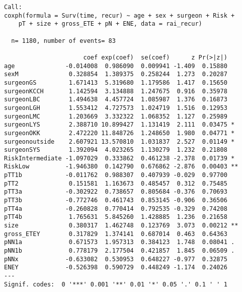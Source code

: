 \documentclass[
  letterpaper,
  DIV=11,
  numbers=noendperiod]{scrartcl}
\begin{document}
\begin{verbatim}
Call:
coxph(formula = Surv(time, recur) ~ age + sex + surgeon + Risk + 
    pT + size + gross_ETE + pN + ENE, data = rai_recur)

  n= 1180, number of events= 83 

                      coef exp(coef)  se(coef)      z Pr(>|z|)   
age              -0.014008  0.986090  0.009941 -1.409  0.15880   
sexM              0.328854  1.389375  0.258244  1.273  0.20287   
surgeonGS         1.671413  5.319680  1.179586  1.417  0.15650   
surgeonKCCH       1.142594  3.134888  1.247675  0.916  0.35978   
surgeonLBC        1.494638  4.457724  1.085987  1.376  0.16873   
surgeonLGH        1.553412  4.727573  1.024719  1.516  0.12953   
surgeonLMC        1.203669  3.332322  1.068352  1.127  0.25989   
surgeonLYS        2.388710 10.899427  1.131419  2.111  0.03475 * 
surgeonOKK        2.472220 11.848726  1.248650  1.980  0.04771 * 
surgeonoutside    2.607921 13.570810  1.031837  2.527  0.01149 * 
surgeonSYS        1.392094  4.023265  1.130279  1.232  0.21808   
RiskIntermediate -1.097029  0.333862  0.461238 -2.378  0.01739 * 
RiskLow          -1.946380  0.142790  0.676862 -2.876  0.00403 **
pTT1b            -0.011762  0.988307  0.407939 -0.029  0.97700   
pTT2              0.151581  1.163673  0.485457  0.312  0.75485   
pTT3a            -0.302922  0.738657  0.805684 -0.376  0.70693   
pTT3b            -0.772746  0.461743  0.853145 -0.906  0.36506   
pTT4a            -0.260828  0.770414  0.792535 -0.329  0.74208   
pTT4b             1.765631  5.845260  1.428885  1.236  0.21658   
size              0.380317  1.462748  0.123769  3.073  0.00212 **
gross_ETEY        0.317829  1.374141  0.687014  0.463  0.64363   
pNN1a             0.671573  1.957313  0.384123  1.748  0.08041 . 
pNN1b             0.778179  2.177504  0.421857  1.845  0.06509 . 
pNNx             -0.633082  0.530953  0.648227 -0.977  0.32875   
ENEY             -0.526398  0.590729  0.448249 -1.174  0.24026   
---
Signif. codes:  0 '***' 0.001 '**' 0.01 '*' 0.05 '.' 0.1 ' ' 1


\end{verbatim}
\end{document}
